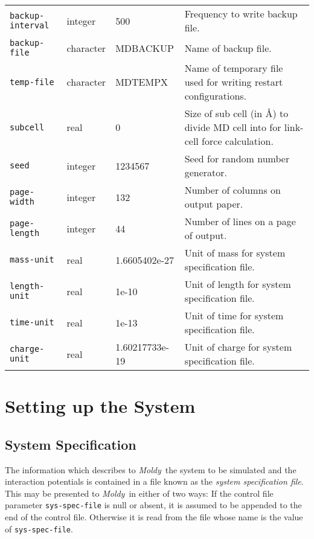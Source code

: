 \documentclass[twoside]{report}
\newcommand{\moldy}{{\em Moldy}}
\begin{document}
\begin{table}
\begin{minipage}{\textwidth}
\begin{tabular}{|l|l|l|p{2.9in}|}
\texttt{backup-interval} &        integer &               500 &
Frequency to write backup file. \\
\texttt{backup-file} &            character  &    MDBACKUP &
Name of backup file. \\ \hline
\texttt{temp-file} &              character  &    MDTEMPX &
Name of temporary file used for writing restart configurations. \\ \hline
\texttt{subcell} &                real &                  0 &
Size of sub cell (in \AA) to divide MD cell into for link-cell force
calculation. \\ \hline
\texttt{seed} &                   integer &               1234567 &
Seed for random number generator. \\ \hline
\texttt{page-width} &             integer &               132 & 
Number of columns on output paper. \\
\texttt{page-length} &    integer &               44 &
Number of lines on a page of output. \\ \hline
\texttt{mass-unit} &              real &                  1.6605402e-27 &
Unit of mass for system specification file. \\
\texttt{length-unit} &            real &                  1e-10 &
Unit of length for system specification file. \\
\texttt{time-unit} &              real &                  1e-13 &
Unit of time for system specification file. \\
\texttt{charge-unit} &            real &                  1.60217733e-19 &
Unit of charge for system specification file. \\ \hline
\end{tabular}
\end{minipage}
\end{table}

\section{Setting up the System}%
\subsection{System Specification}
\label{sec:sys-spec}

The information which describes to \moldy\  the system to be simulated
and the interaction potentials is contained in a file known as the
{\em system specification file}.  This may be presented to \moldy\  in
either of two ways: If the control file parameter \texttt{sys-spec-file}
is null or absent, it is assumed to be appended to the end of the
control file.  Otherwise it is read from the file whose name is
the value of \texttt{sys-spec-file}.
\end{document}
